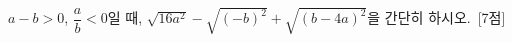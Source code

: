 $a-b>0$, $\dfrac{a}{b}<0$일 때, $\sqrt{16a^2}-\sqrt{(-b)^2}+\sqrt{(b-4a)^2}$을 간단히 하시오.~\mbox{\mbox{[7점]}}
